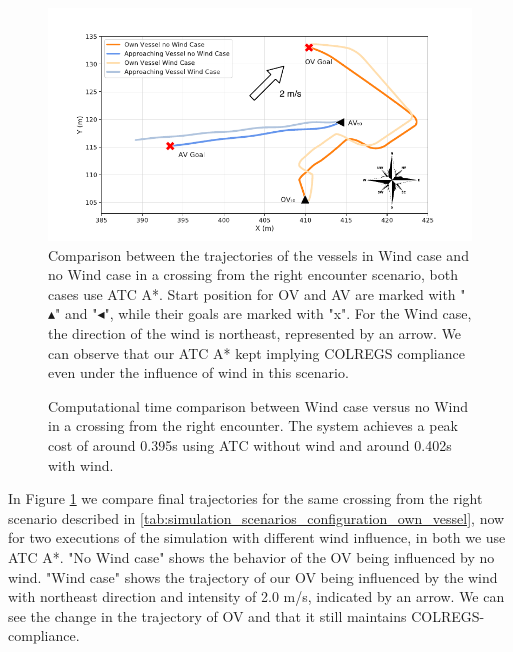         \begin{figure}[H]
            \centering
            \includegraphics[width=\textwidth]{figs/Chap5/march9/plot_cr_w_vs_wind.pdf}
            \caption{Comparison between the trajectories of the vessels in Wind case and no Wind case in a crossing from the right encounter scenario, both cases use \ac{ATC} A*. Start position for \ac{OV} and \ac{AV} are marked with "$\blacktriangle$" and "$\blacktriangleleft$", while their goals are marked with "x". For the Wind case, the direction of the wind is northeast, represented by an arrow. We can observe that our \ac{ATC} A* kept implying COLREGS compliance even under the influence of wind in this scenario.}
            \label{fig:plot_cr_w_vs_wind}
        \end{figure}
        
        \begin{figure}[H]
            \centering
            
            \caption{Computational time comparison between Wind case versus no Wind in a crossing from the right encounter. The system achieves a peak cost of around 0.395s using \ac{ATC} without wind and around 0.402s with wind.}
            \label{fig:plot_cr_w_vs_wind_CT}
        \end{figure}
        
        In Figure \ref{fig:plot_cr_w_vs_wind} we compare final trajectories for the same crossing from the right scenario described in \ref{tab:simulation_scenarios_configuration_own_vessel}, now for two executions of the simulation with different wind influence, in both we use \ac{ATC} A*. "No Wind case" shows the behavior of the \ac{OV} being influenced by no wind. "Wind case" shows the trajectory of our \ac{OV} being influenced by the wind with northeast direction and intensity of 2.0 m/s, indicated by an arrow. We can see the change in the trajectory of \ac{OV} and that it still maintains \ac{COLREGS}-compliance. 
        
